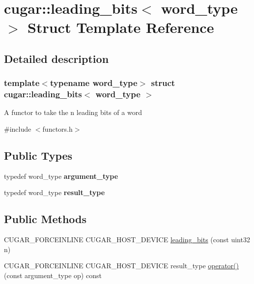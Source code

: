 \hypertarget{structcugar_1_1leading__bits}{}\section{cugar\+:\+:leading\+\_\+bits$<$ word\+\_\+type $>$ Struct Template Reference}
\label{structcugar_1_1leading__bits}


\subsection{Detailed description}
\subsubsection*{template$<$typename word\+\_\+type$>$\newline
struct cugar\+::leading\+\_\+bits$<$ word\+\_\+type $>$}

A functor to take the n leading bits of a word 

{\ttfamily \#include $<$functors.\+h$>$}

\subsection*{Public Types}
\begin{DoxyCompactItemize}
\item 
\mbox{\label{structcugar_1_1leading__bits_ada87e6f1814ff63b21eb2501ac0c6b65}} 
typedef word\+\_\+type {\bfseries argument\+\_\+type}
\item 
\mbox{\label{structcugar_1_1leading__bits_a20a4ef6d516ed8e44d3ff81f67371f4c}} 
typedef word\+\_\+type {\bfseries result\+\_\+type}
\end{DoxyCompactItemize}
\subsection*{Public Methods}
\begin{DoxyCompactItemize}
\item 
C\+U\+G\+A\+R\+\_\+\+F\+O\+R\+C\+E\+I\+N\+L\+I\+NE C\+U\+G\+A\+R\+\_\+\+H\+O\+S\+T\+\_\+\+D\+E\+V\+I\+CE \hyperlink{structcugar_1_1leading__bits_ad6af66423d99cd96d71bc96aba0d8bf0}{leading\+\_\+bits} (const uint32 n)
\item 
C\+U\+G\+A\+R\+\_\+\+F\+O\+R\+C\+E\+I\+N\+L\+I\+NE C\+U\+G\+A\+R\+\_\+\+H\+O\+S\+T\+\_\+\+D\+E\+V\+I\+CE result\+\_\+type \hyperlink{structcugar_1_1leading__bits_aac537b0be4fe5120f9db93f46a22c057}{operator()} (const argument\+\_\+type op) const
\end{DoxyCompactItemize}
